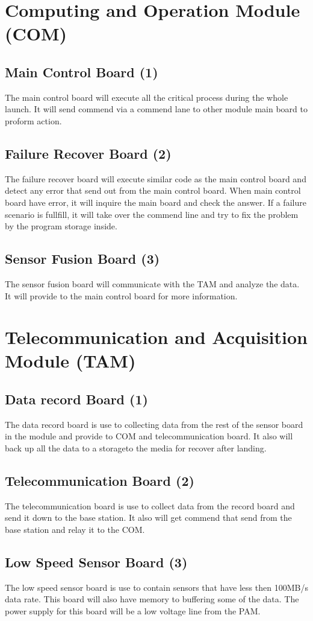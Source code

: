 \documentclass[12pt,article]{memoir}
\begin{document}
\section{Computing and Operation Module (COM)}
\subsection{Main Control Board (1)}
The main control board will execute all the critical process during the whole launch. It will send commend via a commend lane to other module main board to proform action.
\subsection{Failure Recover Board (2)}
The failure recover board will execute similar code as the main control board and detect any error that send out from the main control board. When main control board have error, it will inquire the main board and check the answer. If a failure scenario is fullfill, it will take over the commend line and try to fix the problem by the program storage inside.
\subsection{Sensor Fusion Board (3)}
The sensor fusion board will communicate with the TAM and analyze the data. It will provide to the main control board for more information.
\section{Telecommunication and Acquisition Module (TAM)}
\subsection{Data record Board (1)}
The data record board is use to collecting data from the rest of the sensor board in the module and provide to COM and telecommunication board. It also will back up all the data to a storageto the media for recover after landing.
\subsection{Telecommunication Board (2)}
The telecommunication board is use to collect data from the record board and send it down to the base station. It also will get commend that send from the base station and relay it to the COM.
\subsection{Low Speed Sensor Board (3)}
The low speed sensor board is use to contain sensors that have less then 100MB/s data rate. This board will also have memory to buffering some of the data. The power supply for this board will be a low voltage line from the PAM.
\end{document}
